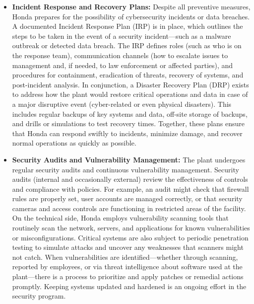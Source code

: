 \begin{itemize}
    \item \textbf{Incident Response and Recovery Plans:} Despite all preventive measures, Honda prepares for the possibility of cybersecurity incidents or data breaches. A documented Incident Response Plan (IRP) is in place, which outlines the steps to be taken in the event of a security incident---such as a malware outbreak or detected data breach. The IRP defines roles (such as who is on the response team), communication channels (how to escalate issues to management and, if needed, to law enforcement or affected parties), and procedures for containment, eradication of threats, recovery of systems, and post-incident analysis. In conjunction, a Disaster Recovery Plan (DRP) exists to address how the plant would restore critical operations and data in case of a major disruptive event (cyber-related or even physical disasters). This includes regular backups of key systems and data, off-site storage of backups, and drills or simulations to test recovery times. Together, these plans ensure that Honda can respond swiftly to incidents, minimize damage, and recover normal operations as quickly as possible.
    \item \textbf{Security Audits and Vulnerability Management:} The plant undergoes regular security audits and continuous vulnerability management. Security audits (internal and occasionally external) review the effectiveness of controls and compliance with policies. For example, an audit might check that firewall rules are properly set, user accounts are managed correctly, or that security cameras and access controls are functioning in restricted areas of the facility. On the technical side, Honda employs vulnerability scanning tools that routinely scan the network, servers, and applications for known vulnerabilities or misconfigurations. Critical systems are also subject to periodic penetration testing to simulate attacks and uncover any weaknesses that scanners might not catch. When vulnerabilities are identified—whether through scanning, reported by employees, or via threat intelligence about software used at the plant—there is a process to prioritize and apply patches or remedial actions promptly. Keeping systems updated and hardened is an ongoing effort in the security program.

\end{itemize}
